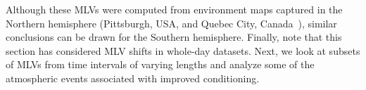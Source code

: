 
Although these MLVs were computed from environment maps captured in the Northern hemisphere (Pittsburgh, USA, and Quebec City, Canada~\cite{holdgeoffroy-iccp-15}), similar conclusions can be drawn for the Southern hemisphere. Finally, note that this section has considered MLV shifts in whole-day datasets. Next, we look at subsets of MLVs from time intervals of varying lengths and analyze some of the atmospheric events associated with improved conditioning.



